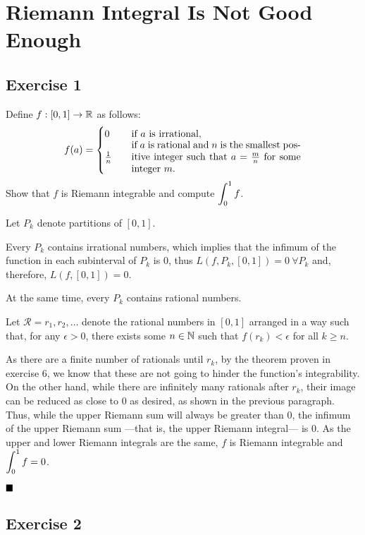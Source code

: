 \section{Riemann Integral Is Not Good Enough}

\subsection{Exercise 1}

\begin{formulationBox}
	Define $f:[0,1]\rightarrow\mathbb{R}$ as follows:
	\[
		f(a) =
		\begin{cases}
			0 &\quad \textrm{if $a$ is irrational,}\\
			\frac{1}{n} &\quad \parbox{.5\linewidth}{if $a$ is rational and $n$ is the smallest positive integer such that $a=\frac{m}{n}$ for some integer $m$.}
		\end{cases}
	\]
	Show that $f$ is Riemann integrable and compute $\displaystyle \int_{0}^{1}f$.
\end{formulationBox}

Let $P_k$ denote partitions of $[0,1]$.

Every $P_k$ contains irrational numbers, which implies that the infimum of the function in each subinterval of $P_k$ is 0, thus $L(f, P_k, [0,1]) = 0\ \forall P_k$ and, therefore, $L(f, [0,1]) = 0$.

At the same time, every $P_k$ contains rational numbers.

Let $\mathcal{R} = r_1, r_2, \dots$ denote the rational numbers in $[0, 1]$ arranged in a way such that, for any $\epsilon>0$, there exists some $n\in\mathbb{N}$ such that $f(r_k)<\epsilon$ for all $k\geq n$.

As there are a finite number of rationals until $r_k$, by the theorem proven in exercise 6, we know that these are not going to hinder the function's integrability. On the other hand, while there are infinitely many rationals after $r_k$, their image can be reduced as close to 0 as desired, as shown in the previous paragraph. Thus, while the upper Riemann sum will always be greater than 0, the infimum of the upper Riemann sum —that is, the upper Riemann integral— is 0. As the upper and lower Riemann integrals are the same, $f$ is Riemann integrable and $\displaystyle \int_{0}^{1}f = 0$.

$\qed$

\subsection{Exercise 2}

